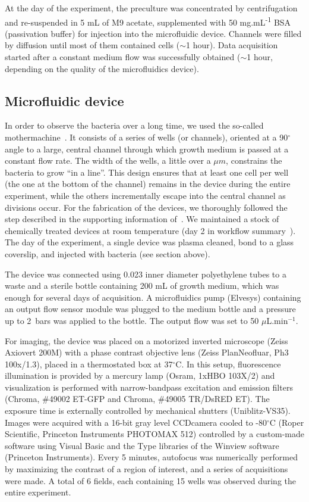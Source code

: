 At the day of the experiment, the preculture was concentrated by centrifugation
and re-suspended in 5 mL of M9 acetate, supplemented with 50 mg.mL\textsuperscript{-1}
BSA (passivation buffer) for injection into the microfluidic device.
Channels were filled by diffusion until most of them contained cells
($\sim$1 hour). Data acquisition started after a constant medium
flow was successfully obtained ($\sim$1 hour, depending on the quality
of the microfluidics device).

\subsection{Microfluidic device}

\label{sec:microflu}

In order to observe the bacteria over a long time, we used the so-called
mothermachine~\cite{wang_robust_2010}. It consists of a series of
wells (or channels), oriented at a 90$^{\circ}$ angle to a large,
central channel through which growth medium is passed at a constant
flow rate. The width of the wells, a little over a $\mu m$, constrains
the bacteria to grow ``in a line''. This design ensures that at
least one cell per well (the one at the bottom of the channel) remains
in the device during the entire experiment, while the others incrementally
escape into the central channel as divisions occur. For the fabrication
of the devices, we thoroughly followed the step described in the supporting
information of~\cite{wang_robust_2010}. We maintained a stock of
chemically treated devices at room temperature (day 2 in workflow
summary~\cite{wang_robust_2010}). The day of the experiment, a single
device was plasma cleaned, bond to a glass coverslip, and injected
with bacteria (see section above).

The device was connected using 0.023\textquotedbl{} inner diameter
polyethylene tubes to a waste and a sterile bottle containing 200
mL of growth medium, which was enough for several days of acquisition.
A microfluidics pump (Elvesys) containing an output flow sensor module
was plugged to the medium bottle and a pressure up to 2~bars was
applied to the bottle. The output flow was set to 50 $\mu$L.min$^{-1}$.

For imaging, the device was placed on a motorized inverted microscope
(Zeiss Axiovert 200M) with a phase contrast objective lens (Zeiss
PlanNeofluar, Ph3 100x/1.3), placed in a thermostated box at 37$^{\circ}$C.
In this setup, fluorescence illumination is provided by a mercury
lamp (Osram, 1xHBO 103X/2) and visualization is performed with narrow-bandpass
excitation and emission filters (Chroma, \#49002 ET-GFP and Chroma,
\#49005 TR/DsRED ET). The exposure time is externally controlled by
mechanical shutters (Uniblitz-VS35). Images were acquired with a 16-bit
gray level CCDcamera cooled to -80$^{\circ}$C (Roper Scientific,
Princeton Instruments PHOTOMAX 512) controlled by a custom-made software
using Visual Basic and the Type libraries of the Winview software
(Princeton Instruments). Every 5 minutes, autofocus was numerically
performed by maximizing the contrast of a region of interest, and
a series of acquisitions were made. A total of 6 fields, each containing
15 wells was observed during the entire experiment.

